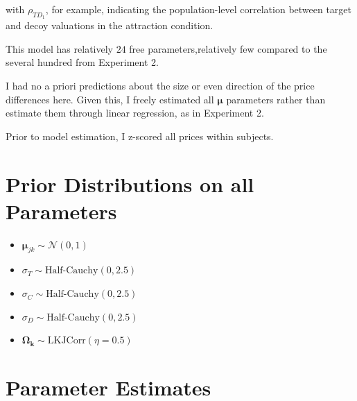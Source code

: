 with $\rho_{TD_1}$, for example, indicating the population-level correlation between target and decoy valuations in the attraction condition.

This model has relatively $24$ free parameters,relatively few compared to the several hundred from Experiment 2.

I had no a priori predictions about the size or even direction of the price differences here. Given this, I freely estimated all $\boldsymbol{\mu}$ parameters rather than estimate them through linear regression, as in Experiment 2.

Prior to model estimation, I z-scored all prices within subjects. 

\section{Prior Distributions on all Parameters}

\begin{itemize}
    \item $\boldsymbol{\mu}_{jk} \sim \mathcal{N}(0,1)$
    \item $\sigma_{T} \sim \text{Half-Cauchy}(0,2.5)$
    \item $\sigma_{C} \sim \text{Half-Cauchy}(0,2.5)$
    \item $\sigma_{D} \sim \text{Half-Cauchy}(0,2.5)$
    \item $\boldsymbol{\Omega_{k}} \sim \text{LKJCorr}(\eta=0.5)$
\end{itemize}

\section{Parameter Estimates}

